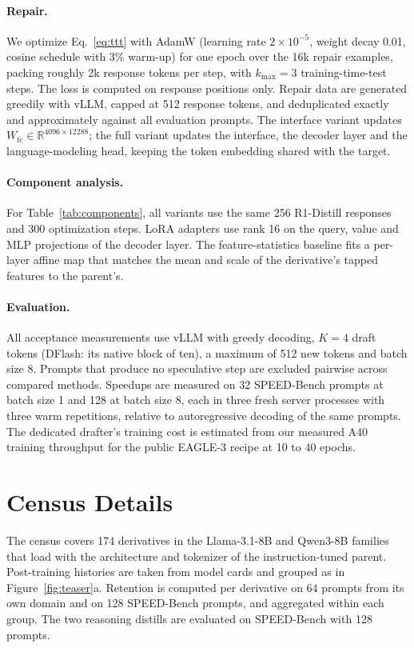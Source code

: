 \documentclass[11pt]{article}
\begin{document}
\paragraph{Repair.}
We optimize Eq.~\eqref{eq:ttt} with AdamW (learning rate $2\times10^{-5}$, weight decay 0.01, cosine schedule with 3\% warm-up) for one epoch over the 16k repair examples, packing roughly 2k response tokens per step, with $k_{\max}{=}3$ training-time-test steps.
The loss is computed on response positions only.
Repair data are generated greedily with vLLM, capped at 512 response tokens, and deduplicated exactly and approximately against all evaluation prompts.
The interface variant updates $W_{\text{fc}} \in \mathbb{R}^{4096 \times 12288}$; the full variant updates the interface, the decoder layer and the language-modeling head, keeping the token embedding shared with the target.

\paragraph{Component analysis.}
For Table~\ref{tab:components}, all variants use the same 256 R1-Distill responses and 300 optimization steps.
LoRA adapters use rank 16 on the query, value and MLP projections of the decoder layer.
The feature-statistics baseline fits a per-layer affine map that matches the mean and scale of the derivative's tapped features to the parent's.

\paragraph{Evaluation.}
All acceptance measurements use vLLM with greedy decoding, $K{=}4$ draft tokens (DFlash: its native block of ten), a maximum of 512 new tokens and batch size 8.
Prompts that produce no speculative step are excluded pairwise across compared methods.
Speedups are measured on 32 SPEED-Bench prompts at batch size 1 and 128 at batch size 8, each in three fresh server processes with three warm repetitions, relative to autoregressive decoding of the same prompts.
The dedicated drafter's training cost is estimated from our measured A40 training throughput for the public EAGLE-3 recipe at 10 to 40 epochs.

\section{Census Details}
\label{app:census}

The census covers 174 derivatives in the Llama-3.1-8B and Qwen3-8B families that load with the architecture and tokenizer of the instruction-tuned parent.
Post-training histories are taken from model cards and grouped as in Figure~\ref{fig:teaser}a.
Retention is computed per derivative on 64 prompts from its own domain and on 128 SPEED-Bench prompts, and aggregated within each group.
The two reasoning distills are evaluated on SPEED-Bench with 128 prompts.
\end{document}
